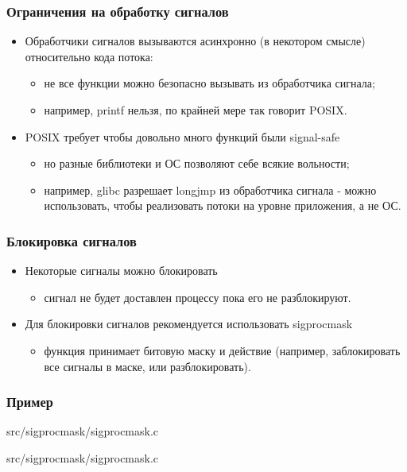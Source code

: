 \begin{frame}
\frametitle{Ограничения на обработку сигналов}
\begin{itemize}
  \item Обработчики сигналов вызываются асинхронно (в некотором смысле)
  относительно кода потока:
  \begin{itemize}
    \item не все функции можно безопасно вызывать из обработчика сигнала;
    \item например, printf нельзя, по крайней мере так говорит POSIX.
  \end{itemize}
  \item POSIX требует чтобы довольно много функций были signal-safe
  \begin{itemize}
    \item но разные библиотеки и ОС позволяют себе всякие вольности;
    \item например, glibc разрешает longjmp из обработчика сигнала - можно
    использовать, чтобы реализовать потоки на уровне приложения, а не ОС.
  \end{itemize}
\end{itemize}
\end{frame}

\begin{frame}
\frametitle{Блокировка сигналов}
\begin{itemize}
  \item Некоторые сигналы можно блокировать
  \begin{itemize}
    \item сигнал не будет доставлен процессу пока его не разблокируют.
  \end{itemize}
  \item Для блокировки сигналов рекомендуется использовать sigprocmask
  \begin{itemize}
    \item функция принимает битовую маску и действие (например,
    заблокировать все сигналы в маске, или разблокировать).
  \end{itemize}
\end{itemize}
\end{frame}

\begin{frame}[fragile]
\frametitle{Пример}

{src/sigprocmask/sigprocmask.c}

{src/sigprocmask/sigprocmask.c}
\end{frame}
